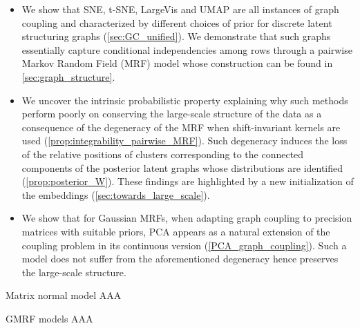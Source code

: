 \begin{itemize}
    \item We show that SNE, t-SNE, LargeVis and UMAP are all instances of graph coupling and characterized by different choices of prior for discrete latent structuring graphs (\cref{sec:GC_unified}). We demonstrate that such graphs essentially capture conditional independencies among rows through a pairwise Markov Random Field (MRF) model whose construction can be found in \cref{sec:graph_structure}.
    \item We uncover the intrinsic probabilistic property explaining why such methods perform poorly on conserving the large-scale structure of the data as a consequence of the degeneracy of the MRF when shift-invariant kernels are used (\cref{prop:integrability_pairwise_MRF}). Such degeneracy induces the loss of the relative positions of clusters corresponding to the connected components of the posterior latent graphs whose distributions are identified (\cref{prop:posterior_W}). These findings are highlighted by a new initialization of the embeddings (\cref{sec:towards_large_scale}).
    \item We show that for Gaussian MRFs, when adapting graph coupling to precision matrices with suitable priors, PCA appears as a natural extension of the coupling problem in its continuous version (\cref{PCA_graph_coupling}). Such a model does not suffer from the aforementioned degeneracy hence preserves the large-scale structure.
\end{itemize}


\begin{mem1}{Matrix normal model}\label{memo:matrix_normal}
    AAA
\end{mem1}

\begin{mem1}{GMRF models}
    AAA
\end{mem1}